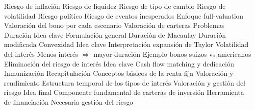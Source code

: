 \documentclass{nuevotema}
\begin{document}
\begin{esquema}[enumerate]
			\3 Riesgo de inflación
			\3 Riesgo de liquidez
			\3 Riesgo de tipo de cambio
			\3 Riesgo de volatilidad
			\3 Riesgo político
			\3 Riesgo de eventos inesperados
		\2 Enfoque full-valuation
			\3 Valoración del bono por cada escenario
			\3 Valoración de carteras
			\3 Problemas
		\2 Duración
			\3 Idea clave
			\3 Formulación general
			\3 Duración de Macaulay
			\3 Duración modificada
		\2 Convexidad
			\3 Idea clave
			\3 Interpretación expansión de Taylor
		\2 Volatilidad del interés
			\3 Menos interés $\Rightarrow$ mayor duración
			\3 Ejemplo bonos suizos vs americanos
		\2 Eliminación del riesgo de interés
			\3 Idea clave
			\3 Cash flow matching y dedicación
			\3 Inmunización
	\1[] 
		\2 Recapitulación
			\3 Conceptos básicos de la renta fija
			\3 Valoración y rendimiento
			\3 Estructura temporal de los tipos de interés
			\3 Valoración y gestión del riesgo
		\2 Idea final
			\3 Componente fundamental de carteras de inversión
			\3 Herramienta de financiación
			\3 Necesaria gestión del riesgo

\end{esquema}

\esquemalargo
\end{document}
